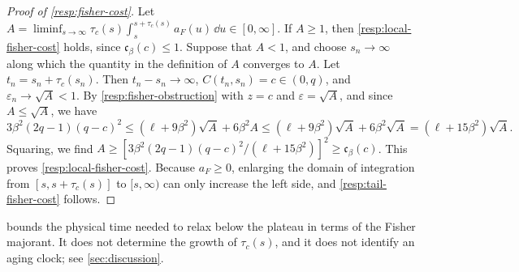 \begin{proof}[Proof of \cref{resp:fisher-cost}]
Let $A=\liminf_{s\to\infty}\tau_c(s)\int_s^{s+\tau_c(s)}a_F(u)\,\dd u\in[0,\infty]$. If $A\ge1$, then \eqref{resp:local-fisher-cost} holds, since $\mathfrak c_\beta(c)\le1$. Suppose that $A<1$, and choose $s_n\to\infty$ along which the quantity in the definition of $A$ converges to $A$. Let $t_n=s_n+\tau_c(s_n)$. Then $t_n-s_n\to\infty$, $C(t_n,s_n)=c\in(0,q)$, and $\varepsilon_n\to\sqrt A<1$. By \cref{resp:fisher-obstruction} with $z=c$ and $\varepsilon=\sqrt A$, and since $A\le\sqrt A$, we have
\[
 3\beta^2(2q-1)(q-c)^2
 \le(\ell+9\beta^2)\sqrt A+6\beta^2A
 \le(\ell+9\beta^2)\sqrt A+6\beta^2\sqrt A
 =(\ell+15\beta^2)\sqrt A .
\]
Squaring, we find $A\ge[3\beta^2(2q-1)(q-c)^2/(\ell+15\beta^2)]^2\ge\mathfrak c_\beta(c)$. This proves \eqref{resp:local-fisher-cost}. Because $a_F\ge0$, enlarging the domain of integration from $[s,s+\tau_c(s)]$ to $[s,\infty)$ can only increase the left side, and \eqref{resp:tail-fisher-cost} follows.
\end{proof}

 bounds the physical time needed to relax below the plateau in terms of the Fisher majorant. It does not determine the growth of $\tau_c(s)$, and it does not identify an aging clock; see \cref{sec:discussion}.
